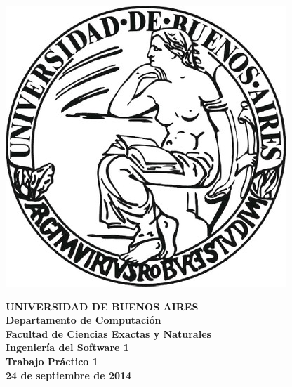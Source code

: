 \documentclass[a4paper]{artcle}
\begin{document}

\def\Materia{Ingenier\'ia del Software 1}
\def\Titulo{Trabajo Pr\'actico 1}
\def\Fecha{24 de septiembre de 2014}


\thispagestyle{empty}

\begin{center}
	\includegraphics[scale = 0.25]{logo_uba.jpg}
\end{center}

\vspace{5mm}

\begin{center}
	{\textbf{\large UNIVERSIDAD DE BUENOS AIRES}}\\[1.5em]
	{\textbf{\large Departamento de Computaci\'{o}n}}\\[1.5em]
    {\textbf{\large Facultad de Ciencias Exactas y Naturales}}\\
    \vspace{35mm}
    {\LARGE\textbf{\Materia}}\\[1em]    
    \vspace{15mm}
    {\Large \textbf{\Titulo}}\\[1em]
    \vspace{15mm}
    {\textbf{\Large \Fecha}}\\
    \vspace{15mm}
    \textbf{\tablaints}
\end{center}
\end{document}
